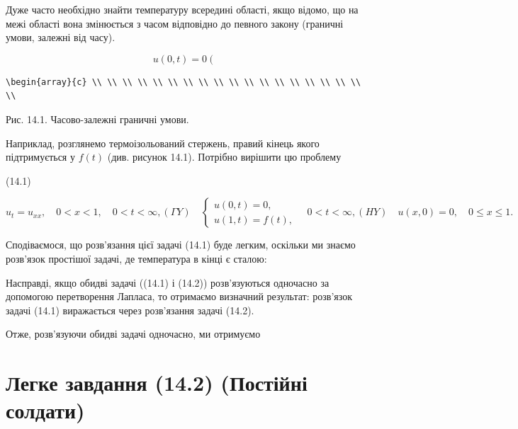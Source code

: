 \documentclass[
  ukrainian,
]{article}
\begin{document}
Дуже часто необхідно знайти температуру всередині області, якщо відомо,
що на межі області вона змінюється з часом відповідно до певного закону
(граничні умови, залежні від часу).

\[
u(0,t)=0 \left(
\]

\begin{verbatim}
\begin{array}{c} \\ \\ \\ \\ \\ \\ \\ \\ \\ \\ \\ \\ \\ \\ \\ \\ \\ \\ \\
\end{verbatim}

Рис. 14.1. Часово-залежні граничні умови.

Наприклад, розглянемо термоізольований стержень, правий кінець якого
підтримується у \(f(t)\) (див. рисунок 14.1). Потрібно вирішити цю
проблему

(14.1)

\[
u_{t} = u_{xx}, \quad 0 < x < 1, \quad 0 < t < \infty,
(\Gamma Y) \quad \begin{cases} u(0, t) = 0, \\ u(1, t) = f(t), \end{cases} \quad 0 < t < \infty,
(HY) \quad u(x, 0) = 0, \quad 0 \le x \le 1.
\]

Сподіваємося, що розв'язання цієї задачі (14.1) буде легким, оскільки ми
знаємо розв'язок простішої задачі, де температура в кінці є сталою:

Насправді, якщо обидві задачі ((14.1) і (14.2)) розв'язуються одночасно
за допомогою перетворення Лапласа, то отримаємо визначний результат:
розв'язок задачі (14.1) виражається через розв'язання задачі (14.2).

Отже, розв'язуючи обидві задачі одночасно, ми отримуємо

\section{Легке завдання (14.2) (Постійні
солдати)}\label{ux43bux435ux433ux43aux435-ux437ux430ux432ux434ux430ux43dux43dux44f-14.2-ux43fux43eux441ux442ux456ux439ux43dux456-ux441ux43eux43bux434ux430ux442ux438}
\end{document}
